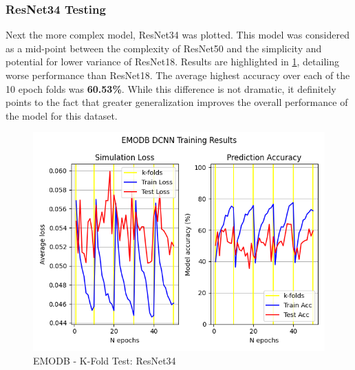 \subsubsection{ResNet34 Testing}
Next the more complex model, ResNet34 was plotted. This model was considered as a mid-point between the complexity of ResNet50 and the simplicity and potential for lower variance of ResNet18. Results are highlighted in \ref{pilot_r34_fig}, detailing worse performance than ResNet18. The average highest accuracy over each of the 10 epoch folds was \textbf{60.53\%}. While this difference is not dramatic, it definitely points to the fact that greater generalization improves the overall performance of the model for this dataset. 
\begin{figure}[ht]
        \centering
        \includegraphics[scale = 0.6]{images_results/EMODB-FinalResults/EMODB_TrainResults_30-05__19-39.png}
        \caption{EMODB - K-Fold Test: ResNet34}
        \label{pilot_r34_fig}
\end{figure}
